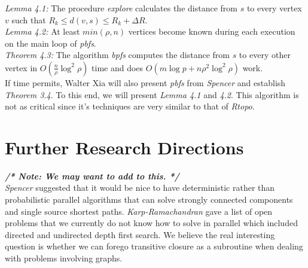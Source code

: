 \documentclass[paper=a4, fontsize=11pt]{scrartcl} %
\numberwithin{equation}{section} %
\numberwithin{figure}{section} %
\numberwithin{table}{section} %
\begin{document}
\textit{Lemma 4.1:} The procedure \textit{explore} calculates the distance from $s$ to every vertex $v$ such that $R_k \leq d(v,s) \leq R_k + \Delta{R}$.\\

\textit{Lemma 4.2:} At least $min(\rho,n)$ vertices become known during each execution on the main loop of \textit{pbfs}.\\

\textit{Theorem 4.3:} The algorithm \textit{bpfs} computes the distance from $s$ to every other vertex in $O(\frac{n}{\rho}\log^2{\rho})$ time and does $O(m\log{p} + n\rho^2\log^2{\rho})$ work.\\

If time permits, Walter Xia will also present \textit{pbfs} from \textit{Spencer\cite{S97}} and establish \textit{Theorem 3.4}. To this end, we will present \textit{Lemma 4.1} and \textit{4.2}. This algorithm is not as critical since it's techniques are very similar to that of \textit{Rtopo}.


\section{Further Research Directions}
\textbf{\textit{/* Note: We may want to add to this. */}}\\
\textit{Spencer\cite{S97}} suggested that it would be nice to have deterministic rather than probabilistic parallel algorithms that can solve strongly connected components and single source shortest paths. \textit{Karp-Ramachandran\cite{KR90}} gave a list of open problems that we currently do not know how to solve in parallel which included directed and  undirected depth first search. We believe the real interesting question is whether we can forego transitive closure as a subroutine when dealing with problems involving graphs.






\end{document}
